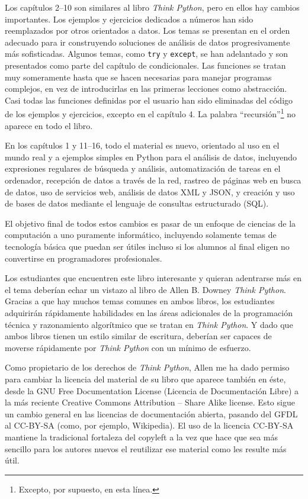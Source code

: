 Los capítulos 2--10 son similares al libro \emph{Think Python},
pero en ellos hay cambios importantes. Los ejemplos y ejercicios
dedicados a números han sido reemplazados por otros orientados a datos.
Los temas se presentan en el orden adecuado para ir construyendo soluciones
de análisis de datos progresivamente más sofisticadas.
Algunos temas, como {\tt try} y {\tt except}, se han adelantado
y son presentados como parte del capítulo de condicionales.
Las funciones se tratan muy someramente hasta que se hacen necesarias
para manejar programas complejos, en vez de introducirlas en las primeras
lecciones como abstracción. Casi todas las funciones definidas por el usuario
han sido eliminadas del código de los ejemplos y ejercicios, excepto en el capítulo 4.
La palabra ``recursión''\footnote{Excepto, por supuesto, en esta línea.}
no aparece en todo el libro.

En los capítulos 1 y 11--16, todo el material es nuevo, orientado
al uso en el mundo real y a ejemplos simples en Python para el
análisis de datos, incluyendo expresiones regulares de búsqueda y análisis,
automatización de tareas en el ordenador, recepción de datos a través de la red,
rastreo de páginas web en busca de datos,
uso de servicios web, análisis de datos XML y JSON, y creación y uso
de bases de datos mediante el lenguaje de consultas estructurado (SQL).

El objetivo final de todos estos cambios es pasar de un enfoque
de ciencias de la computación a uno puramente informático, incluyendo
solamente temas de tecnología básica que puedan
ser útiles incluso si los alumnos al final eligen no convertirse en
programadores profesionales.

Los estudiantes que encuentren este libro interesante y quieran adentrarse
más en el tema deberían echar un vistazo al libro de Allen B. Downey
\emph{Think Python}. Gracias a que hay muchos temas comunes en ambos libros,
los estudiantes adquirirán rápidamente habilidades en las áreas adicionales
de la programación técnica y razonamiento algorítmico que se tratan en
\emph{Think Python}.
Y dado que ambos libros tienen un estilo similar de escritura, deberían ser
capaces de moverse rápidamente por \emph{Think Python} con un mínimo de esfuerzo.

Como propietario de los derechos de \emph{Think Python},
Allen me ha dado permiso para cambiar la licencia
del material de su libro que aparece también en éste,
desde la
GNU Free Documentation License (Licencia de Documentación Libre)
a la más reciente
Creative Commons Attribution -- Share Alike license.
Esto sigue un cambio general en las licencias de documentación abierta,
pasando del GFDL al CC-BY-SA (como, por ejemplo, Wikipedia).
El uso de la licencia CC-BY-SA mantiene la tradicional fortaleza del copyleft
a la vez que hace que sea más sencillo para los autores nuevos
el reutilizar ese material como les resulte más útil.

